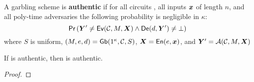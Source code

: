 \begin{definition}[Authenticity]\label{def:authenticity}
  A garbling scheme is \textbf{authentic} if for
  all circuits \cir,
  all inputs $\cirinp$ of length $n$,
  and all poly-time adversaries \adv 
  the following probability is negligible in $\kappa$:
  \[
    \pr{\gcirout' \neq \gEv(\cir, \mat,\gcirinp)
    \land
    \gDe(d, \gcirout') \neq \bot}
  \]
  where
  $S$ is uniform,
  $(M, e, d) = \textsf{Gb}(1^\kappa,\mathcal C,S)$,
  $\gcirinp = \gEn(e,\cirinp)$,
  and $\gcirout' = \adv(\cir, \mat, \gcirinp)$
\end{definition}

\begin{theorem}\label{theorem:authenticity}
  If \underscheme is authentic, then \ourscheme is authentic.
\end{theorem}
\begin{proof}
\end{proof}
